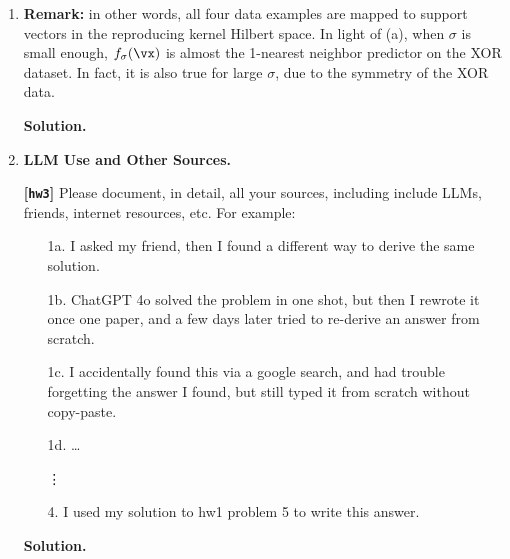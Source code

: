 \documentclass{article}
\def\hw{\textbf{[\texttt{hw3}]}\xspace}
\theoremstyle{definition}
\theoremstyle{remark}
\newenvironment{Q}
{%
\clearpage
\item
}
{%
\phantom{s}%
\bigskip%
\noindent\textbf{Solution.}
}
\begin{document}
\begin{enumerate}[font={\Large\bfseries},leftmargin=0pt]
\begin{Q}
\begin{enumerate}
        \textbf{Remark:} in other words, all four data examples are mapped to support vectors in the reproducing kernel Hilbert space. In light of (a), when $\sigma$ is small enough, $f_{\sigma}(\vx)$ is almost the 1-nearest neighbor predictor on the XOR dataset. In fact, it is also true for large $\sigma$, due to the symmetry of the XOR data.
    \end{enumerate}
\end{Q}

\begin{Q}
  \textbf{\Large LLM Use and Other Sources.}
    
    \hw Please document, in detail, all your sources, including include LLMs, friends,
    internet resources, etc.  For example:
    \begin{enumerate}
      \item[1a.] I asked my friend, then I found a different way to derive the same solution.
      \item[1b.] ChatGPT 4o solved the problem in one shot, but then I rewrote it once one
        paper, and a few days later tried to re-derive an answer from scratch.
      \item[1c.] I accidentally found this via a google search,
        and had trouble forgetting the answer I found, but still typed it from scratch
        without copy-paste.
      \item[1d.] \dots
      \item[\vdots] 
      \item[4.] I used my solution to hw1 problem 5 to write this answer.
    \end{enumerate}
    
\end{Q}

\end{enumerate}

\newpage


\end{document}
